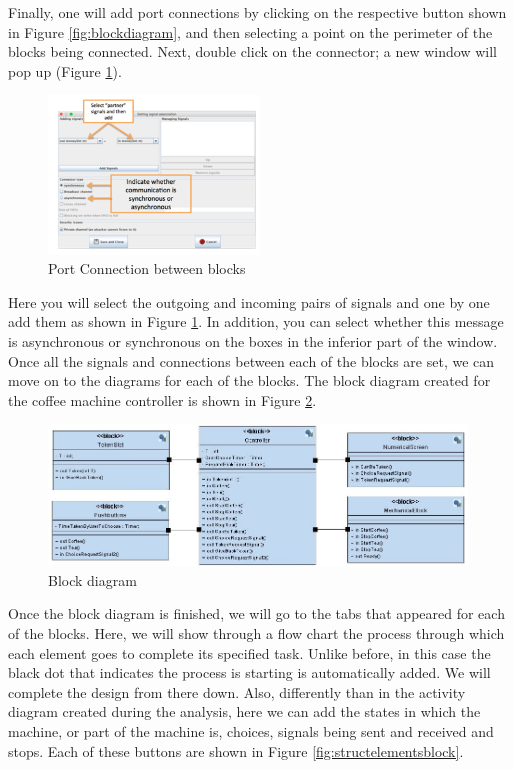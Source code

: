 \documentclass[12pt]{article}
\begin{document}
	Finally, one will add port connections by clicking on the respective button shown in Figure \ref{fig:blockdiagram}, and then selecting a point on the perimeter of the blocks being connected. Next, double click on the connector; a new window will pop up (Figure \ref{fig:portconn}). 
	
	\begin{figure}[htbp]
\centering
\includegraphics[width=0.5\textwidth]{fig/portconn.png}
\caption{Port Connection between blocks} \label{fig:portconn}
\end{figure}

	Here you will select the outgoing and incoming pairs of signals and one by one add them as shown in Figure \ref{fig:portconn}. In addition, you can select whether this message is asynchronous or synchronous on the boxes in the inferior part of the window. Once all the signals and connections between each of the blocks are set, we can move on to the diagrams for each of the blocks.
The block diagram created for the coffee machine controller is shown in Figure \ref{fig:blockdiag}.

	\begin{figure}[htbp]
\centering
\includegraphics[width=0.99\textwidth]{fig/blockdiag.jpg}
\caption{Block diagram} \label{fig:blockdiag}
\end{figure}

Once the block diagram is finished, we will go to the tabs that appeared for each of the blocks. Here, we will show through a flow chart the process through which each element goes to complete its specified task. Unlike before, in this case the black dot that indicates the process is starting is automatically added. We will complete the design from there down. Also, differently than in the activity diagram created during the analysis, here we can add the states in which the machine, or part of the machine is, choices, signals being sent and received and stops. Each of these buttons are shown in Figure \ref{fig:structelementsblock}. 
\end{document}
